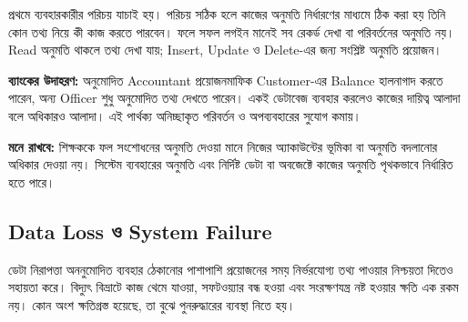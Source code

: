 \begin{chSixSideBySide}[.39]
\raggedright
\small


\chSixNextColumn




প্রথমে ব্যবহারকারীর পরিচয় যাচাই হয়। পরিচয় সঠিক হলে কাজের অনুমতি নির্ধারণের মাধ্যমে ঠিক করা হয় তিনি কোন তথ্য নিয়ে কী কাজ করতে পারবেন। ফলে সফল লগইন মানেই সব রেকর্ড দেখা বা পরিবর্তনের অনুমতি নয়। Read অনুমতি থাকলে তথ্য দেখা যায়; Insert, Update ও Delete-এর জন্য সংশ্লিষ্ট অনুমতি প্রয়োজন।

\textbf{ব্যাংকের উদাহরণ:} অনুমোদিত Accountant প্রয়োজনমাফিক Customer-এর Balance হালনাগাদ করতে পারেন, অন্য Officer শুধু অনুমোদিত তথ্য দেখতে পারেন। একই ডেটাবেজ ব্যবহার করলেও কাজের দায়িত্ব আলাদা বলে অধিকারও আলাদা। এই পার্থক্য অনিচ্ছাকৃত পরিবর্তন ও অপব্যবহারের সুযোগ কমায়।

\textbf{মনে রাখবে:} শিক্ষককে ফল সংশোধনের অনুমতি দেওয়া মানে নিজের অ্যাকাউন্টের ভূমিকা বা অনুমতি বদলানোর অধিকার দেওয়া নয়। সিস্টেম ব্যবহারের অনুমতি এবং নির্দিষ্ট ডেটা বা অবজেক্টে কাজের অনুমতি পৃথকভাবে নির্ধারিত হতে পারে।
\end{chSixSideBySide}





\subsection{Data Loss ও System Failure}
ডেটা নিরাপত্তা অননুমোদিত ব্যবহার ঠেকানোর পাশাপাশি প্রয়োজনের সময় নির্ভরযোগ্য তথ্য পাওয়ার নিশ্চয়তা দিতেও সহায়তা করে। বিদ্যুৎ বিভ্রাটে কাজ থেমে যাওয়া, সফটওয়্যার বন্ধ হওয়া এবং সংরক্ষণযন্ত্র নষ্ট হওয়ার ক্ষতি এক রকম নয়। কোন অংশ ক্ষতিগ্রস্ত হয়েছে, তা বুঝে পুনরুদ্ধারের ব্যবস্থা নিতে হয়।

